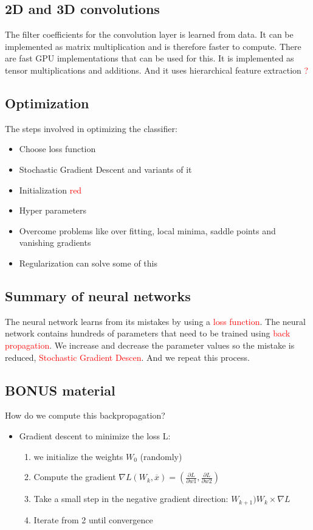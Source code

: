 \subsection*{2D and 3D convolutions}
The filter coefficients for the convolution layer is learned from data. It can be implemented as matrix multiplication and is therefore faster to compute. There are fast GPU implementations that can be used for this. It is implemented as tensor multiplications and additions. And it uses hierarchical feature extraction \textcolor{red}{?} 

\subsection*{Optimization}
The steps involved in optimizing the classifier:

\begin{itemize}
	\item Choose loss function
	\item Stochastic Gradient Descent and variants of it
	\item Initialization \textcolor{red}{red}
	\item Hyper parameters
	\item Overcome problems like over fitting, local minima, saddle points and vanishing gradients
	\item Regularization can solve some of this
\end{itemize}


\subsection*{Summary of neural networks}
The neural network learns from its mistakes by using a \textcolor{red}{loss function}. The neural network contains hundreds of parameters that need to be trained using \textcolor{red}{back propagation}. We increase and decrease the parameter values so the mistake is reduced, \textcolor{red}{Stochastic Gradient
Descen}. And we repeat this process. 


\subsection*{BONUS material}
How do we compute this backpropagation? 
\begin{itemize}
	\item Gradient descent to minimize the loss L:
	\begin{enumerate}
		\item we initialize the weights $W_0$ (randomly)
		\item Compute the gradient $\nabla L(W_k,\overline{x}) = (\frac{\partial L} {\partial w1}, \frac{\partial L} {\partial w2})$ 
		\item Take a small step in the negative gradient direction: $W_{k+1} ) W_k \times \nabla L$
		\item Iterate from 2 until convergence
	\end{enumerate}
\end{itemize}


